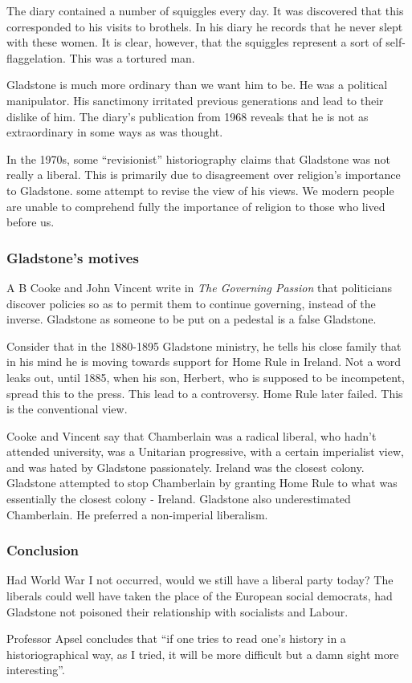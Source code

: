 \documentclass[11pt,a4paper]{report}
\begin{document}
\begin{multicols}{2}
		The diary contained a number of squiggles every day. It was discovered that this corresponded to his visits to brothels. In his diary he records that he never slept with these women. It is clear, however, that the squiggles represent a sort of self-flaggelation. This was a tortured man.
		
		Gladstone is much more ordinary than we want him to be. He was a political manipulator. His sanctimony irritated previous generations and lead to their dislike of him. The diary's publication from 1968 reveals that he is not as extraordinary in some ways as was thought.
		
		In the 1970s, some ``revisionist'' historiography claims that Gladstone was not really a liberal. This is primarily due to disagreement over religion's importance to Gladstone. some attempt to revise the view of his views. We modern people are unable to comprehend fully the importance of religion to those who lived before us.
		
		\subsubsection{Gladstone's motives}
		
		A B Cooke and John Vincent write in \textit{The Governing Passion} that politicians discover policies so as to permit them to continue governing, instead of the inverse. Gladstone as someone to be put on a pedestal is a false Gladstone.
		
		Consider that in the 1880-1895 Gladstone ministry, he tells his close family that in his mind he is moving towards support for Home Rule in Ireland. Not a word leaks out, until 1885, when his son, Herbert, who is supposed to be incompetent, spread this to the press. This lead to a controversy. Home Rule later failed. This is the conventional view.
		
		Cooke and Vincent say that Chamberlain was a radical liberal, who hadn't attended university, was a Unitarian progressive, with a certain imperialist view, and was hated by Gladstone passionately. Ireland was the closest colony. Gladstone attempted to stop Chamberlain by granting Home Rule to what was essentially the closest colony - Ireland. Gladstone also underestimated Chamberlain. He preferred a non-imperial liberalism.
		
		\subsubsection{Conclusion}
		
		Had World War I not occurred, would we still have a liberal party today? The liberals could well have taken the place of the European social democrats, had Gladstone not poisoned their relationship with socialists and Labour.
		
		Professor Apsel concludes that ``if one tries to read one's history in a historiographical way, as I tried, it will be more difficult but a damn sight more interesting''.
		
	\end{multicols}
	
\end{document}
